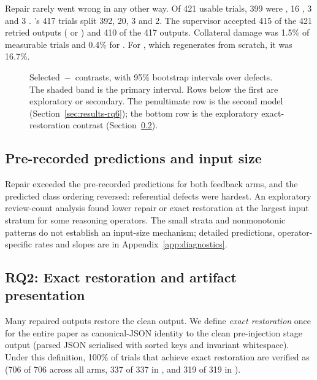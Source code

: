 Repair rarely went wrong in any other way. Of 421 usable  trials, 399
were , 16 , 3  and 3
. 's 417 trials split 392, 20, 3 and 2. The supervisor
accepted 415 of the 421 retried  outputs ( or
) and 410 of the 417  outputs.
Collateral damage was 1.5\% of measurable  trials and 0.4\% for
. For , which regenerates from scratch, it was 16.7\%.

\begin{figure}[t]
\centering

\caption{Selected \,$-$\, contrasts, with 95\%
bootstrap intervals over defects. The shaded band is the primary interval. Rows
below the first are exploratory or secondary. The penultimate row is the second
model (Section~\ref{sec:results-rq6}); the bottom row is the exploratory
exact-restoration contrast (Section~\ref{sec:results-rq2}).}
\label{fig:forest}
\end{figure}

\subsection{Pre-recorded predictions and input size}
\label{sec:results-predictions}
Repair exceeded the pre-recorded predictions for both feedback arms, and the
predicted class ordering reversed: referential defects were hardest. An
exploratory review-count analysis found lower repair or exact restoration at
the largest input stratum for some reasoning operators. The small strata and
nonmonotonic patterns do not establish an input-size mechanism; detailed
predictions, operator-specific rates and slopes are in Appendix~\ref{app:diagnostics}.

\subsection{RQ2: Exact restoration and artifact presentation}
\label{sec:results-rq2}

Many repaired outputs restore the clean output. We define \emph{exact restoration} once for the entire paper as
canonical-JSON identity to the clean pre-injection stage output (parsed JSON
serialised with sorted keys and invariant whitespace). Under this definition,
100\% of trials that achieve exact restoration are verified as 
(706 of 706 across all  arms, 337 of 337 in , and 319 of
319 in ).

